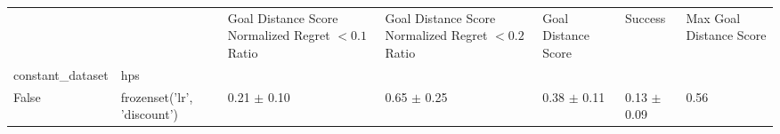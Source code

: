 \begin{tabular}{lllllll}
\toprule
 &  & Goal Distance Score Normalized Regret $< 0.1$ Ratio & Goal Distance Score Normalized Regret $< 0.2$ Ratio & Goal Distance Score & Success & Max Goal Distance Score \\
constant_dataset & hps &  &  &  &  &  \\
\midrule
False & frozenset({'lr', 'discount'}) & 0.21 $\pm$ 0.10 & 0.65 $\pm$ 0.25 & 0.38 $\pm$ 0.11 & 0.13 $\pm$ 0.09 & 0.56 \\
\cline{1-7}
\bottomrule
\end{tabular}

